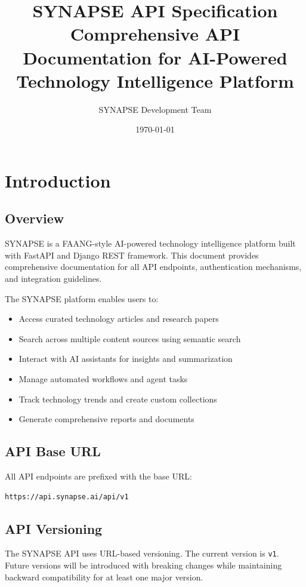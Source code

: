 \documentclass[12pt,a4paper]{report}
\title{\textbf{SYNAPSE API Specification}\\{\normalsize Comprehensive API Documentation for AI-Powered Technology Intelligence Platform}}
\author{SYNAPSE Development Team}
\date{\today}
\begin{document}
\maketitle

\tableofcontents
\newpage

\chapter{Introduction}

\section{Overview}

SYNAPSE is a FAANG-style AI-powered technology intelligence platform built with FastAPI and Django REST framework. This document provides comprehensive documentation for all API endpoints, authentication mechanisms, and integration guidelines.

The SYNAPSE platform enables users to:
\begin{itemize}
    \item Access curated technology articles and research papers
    \item Search across multiple content sources using semantic search
    \item Interact with AI assistants for insights and summarization
    \item Manage automated workflows and agent tasks
    \item Track technology trends and create custom collections
    \item Generate comprehensive reports and documents
\end{itemize}

\section{API Base URL}

All API endpoints are prefixed with the base URL:
\begin{lstlisting}
https://api.synapse.ai/api/v1
\end{lstlisting}

\section{API Versioning}

The SYNAPSE API uses URL-based versioning. The current version is \texttt{v1}. Future versions will be introduced with breaking changes while maintaining backward compatibility for at least one major version.
\end{document}
